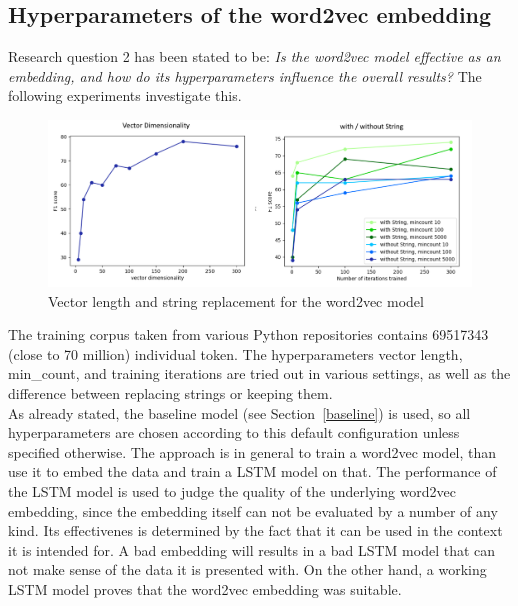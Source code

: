 \documentclass[
a4paper,
pagesize,
pdftex,
12pt,
twoside, %
BCOR=5mm, %
ngerman,
fleqn,
final,
]{scrartcl}
\begin{document}
	\subsection{Hyperparameters of the word2vec embedding}
	
	Research question 2 has been stated to be: \textit{Is the word2vec model effective as an embedding, and how do its hyperparameters influence the overall results?} The following experiments investigate this. 
	
	\begin{figure}[h]
		\centering
		\includegraphics[width=1\textwidth]{img/word2vecHyper2}
		\caption{Vector length and string replacement for the word2vec model}
		\label{fig:w2vhyper2}
	\end{figure}
	
	The training corpus taken from various Python repositories contains 69517343 (close to 70 million) individual token. The hyperparameters vector length, min\_count, and training iterations are tried out in various settings, as well as the difference between replacing strings or keeping them.\\
	As already stated, the baseline model (see Section~\ref{baseline}) is used, so all hyperparameters are chosen according to this default configuration unless specified otherwise. The approach is in general to train a word2vec model, than use it to embed the data and train a LSTM model on that. The performance of the LSTM model is used to judge the quality of the underlying word2vec embedding, since the embedding itself can not be evaluated by a number of any kind. Its effectivenes is determined by the fact that it can be used in the context it is intended for. A bad embedding will results in a bad LSTM model that can not make sense of the data it is presented with. On the other hand, a working LSTM model proves that the word2vec embedding was suitable.
	
\end{document}
